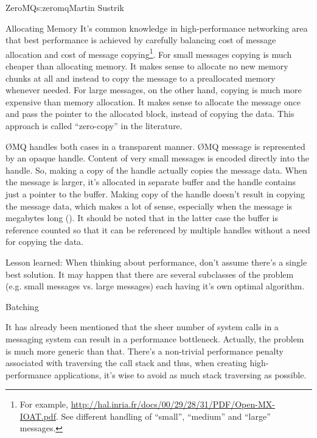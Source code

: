 \begin{aosachapter}{ZeroMQ}{s:zeromq}{Martin Sustrik}
\begin{aosasect1}{Allocating Memory}
It's common knowledge in high-performance networking area that best
performance is achieved by carefully balancing cost of message
allocation and cost of message copying\footnote{For example,
  \url{http://hal.inria.fr/docs/00/29/28/31/PDF/Open-MX-IOAT.pdf}.
  See different handling of ``small'', ``medium'' and ``large''
  messages.}. For small messages copying is much cheaper than
allocating memory. It makes sense to allocate no new memory chunks at
all and instead to copy the message to a preallocated memory whenever
needed. For large messages, on the other hand, copying is much more
expensive than memory allocation. It makes sense to allocate the
message once and pass the pointer to the allocated block, instead of
copying the data. This approach is called ``zero-copy'' in the
literature.

{\O}MQ handles both cases in a transparent manner. {\O}MQ message is
represented by an opaque handle. Content of very small messages is
encoded directly into the handle. So, making a copy of the handle
actually copies the message data. When the message is larger, it's
allocated in separate buffer and the handle contains just a pointer to
the buffer. Making copy of the handle doesn't result in copying the
message data, which makes a lot of sense, especially when the message
is megabytes long (). It should be noted
that in the latter case the buffer is reference counted so that it can
be referenced by multiple handles without a need for copying the data.


Lesson learned: When thinking about performance, don't assume there's
a single best solution. It may happen that there are several
subclasses of the problem (e.g. small messages vs. large messages)
each having it's own optimal algorithm.

\end{aosasect1}

\begin{aosasect1}{Batching}

It has already been mentioned that the sheer number of system calls in
a messaging system can result in a performance bottleneck. Actually,
the problem is much more generic than that. There's a non-trivial
performance penalty associated with traversing the call stack and
thus, when creating high-performance applications, it's wise to avoid
as much stack traversing as possible.


\end{aosasect1}
\end{aosachapter}
